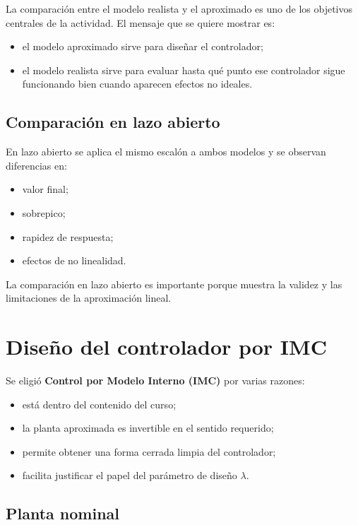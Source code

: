 \documentclass[11pt]{article}
\begin{document}
La comparaci\'on entre el modelo realista y el aproximado es uno de los objetivos centrales de la actividad. El mensaje que se quiere mostrar es:

\begin{itemize}[leftmargin=1.2cm]
\item el modelo aproximado sirve para dise\~nar el controlador;
\item el modelo realista sirve para evaluar hasta qu\'e punto ese controlador sigue funcionando bien cuando aparecen efectos no ideales.
\end{itemize}

\subsection{Comparaci\'on en lazo abierto}

En lazo abierto se aplica el mismo escal\'on a ambos modelos y se observan diferencias en:

\begin{itemize}[leftmargin=1.2cm]
\item valor final;
\item sobrepico;
\item rapidez de respuesta;
\item efectos de no linealidad.
\end{itemize}

La comparaci\'on en lazo abierto es importante porque muestra la validez y las limitaciones de la aproximaci\'on lineal.

\section{Dise\~no del controlador por IMC}

Se eligi\'o \textbf{Control por Modelo Interno (IMC)} por varias razones:

\begin{itemize}[leftmargin=1.2cm]
\item est\'a dentro del contenido del curso;
\item la planta aproximada es invertible en el sentido requerido;
\item permite obtener una forma cerrada limpia del controlador;
\item facilita justificar el papel del par\'ametro de dise\~no $\lambda$.
\end{itemize}

\subsection{Planta nominal}
\end{document}
